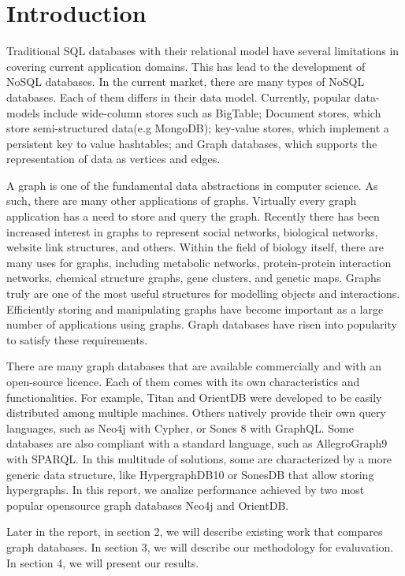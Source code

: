 \section{Introduction}

Traditional SQL databases with their relational model have several limitations in covering current application domains. This has lead to the development of NoSQL databases. In the current market, there are many types of NoSQL databases. Each of them differs in their data model. Currently, popular data-models include wide-column stores such as BigTable; Document stores, which store semi-structured data(e.g MongoDB); key-value stores, which implement a persistent key to value hashtables; and Graph databases, which supports the representation of data as vertices and edges.

A graph is one of the fundamental data abstractions in computer science. As such, there are many other applications of graphs. Virtually every graph application has a need to store and query the graph. Recently there has been increased interest in graphs to represent social networks, biological networks, website link structures, and others. Within the field of biology itself, there are many uses for graphs, including metabolic networks, protein-protein interaction networks, chemical structure graphs, gene clusters, and genetic maps. Graphs truly are one of the most useful structures for modelling objects and interactions. Efficiently storing and manipulating graphs have become important as a large number of applications using graphs. Graph databases have risen into popularity to satisfy these requirements.

There are many graph databases that are available commercially and with an open-source licence. Each of them comes with its own characteristics and functionalities. For example, Titan and OrientDB were developed to be easily distributed among multiple machines. Others natively provide
their own query languages, such as Neo4j with Cypher, or Sones 8 with GraphQL. Some databases are also compliant with a standard language, such as AllegroGraph9 with SPARQL. In this multitude of solutions, some are characterized by a more generic data structure, like HypergraphDB10 or SonesDB that allow storing hypergraphs. In this report, we analize performance achieved by two most popular opensource graph databases Neo4j and OrientDB.

Later in the report, in section 2, we will describe existing work that compares graph databases. In section 3, we will describe our methodology for evaluvation. In section 4, we will present our results.   




